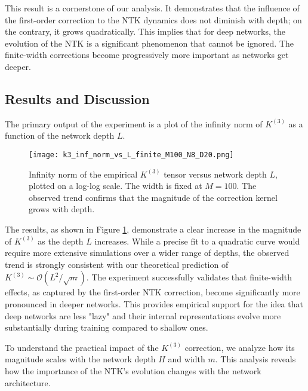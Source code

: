 \documentclass{article}
\newcommand{\Order}{\mathcal{O}}
\begin{document}
This result is a cornerstone of our analysis. It demonstrates that the influence of the first-order correction to the NTK dynamics does not diminish with depth; on the contrary, it grows quadratically. This implies that for deep networks, the evolution of the NTK is a significant phenomenon that cannot be ignored. The finite-width corrections become progressively more important as networks get deeper.



\subsection{Results and Discussion}

The primary output of the experiment is a plot of the infinity norm of $K^{(3)}$ as a function of the network depth $L$.

\begin{figure}[!h]
    \centering
    \texttt{[image: k3\_inf\_norm\_vs\_L\_finite\_M100\_N8\_D20.png]}
    \caption{Infinity norm of the empirical $K^{(3)}$ tensor versus network depth $L$, plotted on a log-log scale. The width is fixed at $M=100$. The observed trend confirms that the magnitude of the correction kernel grows with depth.}
    \label{fig:k3_norm_vs_l}
\end{figure}

The results, as shown in Figure \ref{fig:k3_norm_vs_l}, demonstrate a clear increase in the magnitude of $K^{(3)}$ as the depth $L$ increases. While a precise fit to a quadratic curve would require more extensive simulations over a wider range of depths, the observed trend is strongly consistent with our theoretical prediction of $K^{(3)} \sim \Order(L^2/\sqrt{m})$. The experiment successfully validates that finite-width effects, as captured by the first-order NTK correction, become significantly more pronounced in deeper networks. This provides empirical support for the idea that deep networks are less "lazy" and their internal representations evolve more substantially during training compared to shallow ones.


To understand the practical impact of the $K^{(3)}$ correction, we analyze how its magnitude scales with the network depth $H$ and width $m$. This analysis reveals how the importance of the NTK's evolution changes with the network architecture.
\end{document}
